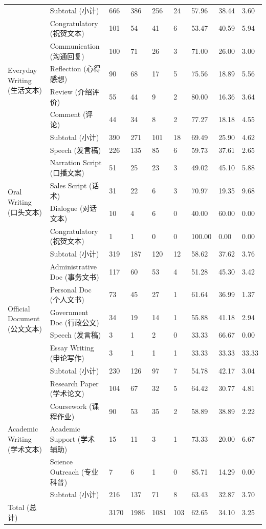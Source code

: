 {\begin{longtable}[]{@{}lllllllll@{}}
& Subtotal (小计) & 666 & 386 & 256 & 24 & 57.96 & 38.44 & 3.60 \\
\multirow{6}{*}{Everyday Writing (生活文本)} & Congratulatory (祝贺文本)
& 101 & 54 & 41 & 6 & 53.47 & 40.59 & 5.94 \\
& Communication (沟通回复) & 100 & 71 & 26 & 3 & 71.00 & 26.00 & 3.00 \\
& Reflection (心得感想) & 90 & 68 & 17 & 5 & 75.56 & 18.89 & 5.56 \\
& Review (介绍评价) & 55 & 44 & 9 & 2 & 80.00 & 16.36 & 3.64 \\
& Comment (评论) & 44 & 34 & 8 & 2 & 77.27 & 18.18 & 4.55 \\
& Subtotal (小计) & 390 & 271 & 101 & 18 & 69.49 & 25.90 & 4.62 \\
\multirow{6}{*}{Oral Writing (口头文本)} & Speech (发言稿) & 226 & 135 &
85 & 6 & 59.73 & 37.61 & 2.65 \\
& Narration Script (口播文案) & 51 & 25 & 23 & 3 & 49.02 & 45.10 &
5.88 \\
& Sales Script (话术) & 31 & 22 & 6 & 3 & 70.97 & 19.35 & 9.68 \\
& Dialogue (对话文本) & 10 & 4 & 6 & 0 & 40.00 & 60.00 & 0.00 \\
& Congratulatory (祝贺文本) & 1 & 1 & 0 & 0 & 100.00 & 0.00 & 0.00 \\
& Subtotal (小计) & 319 & 187 & 120 & 12 & 58.62 & 37.62 & 3.76 \\
\multirow{6}{*}{Official Document (公文文本)} & Administrative Doc
(事务文书) & 117 & 60 & 53 & 4 & 51.28 & 45.30 & 3.42 \\
& Personal Doc (个人文书) & 73 & 45 & 27 & 1 & 61.64 & 36.99 & 1.37 \\
& Government Doc (行政公文) & 34 & 19 & 14 & 1 & 55.88 & 41.18 & 2.94 \\
& Speech (发言稿) & 3 & 1 & 2 & 0 & 33.33 & 66.67 & 0.00 \\
& Essay Writing (申论写作) & 3 & 1 & 1 & 1 & 33.33 & 33.33 & 33.33 \\
& Subtotal (小计) & 230 & 126 & 97 & 7 & 54.78 & 42.17 & 3.04 \\
\multirow{5}{*}{Academic Writing (学术文本)} & Research Paper (学术论文)
& 104 & 67 & 32 & 5 & 64.42 & 30.77 & 4.81 \\
& Coursework (课程作业) & 90 & 53 & 35 & 2 & 58.89 & 38.89 & 2.22 \\
& Academic Support (学术辅助) & 15 & 11 & 3 & 1 & 73.33 & 20.00 &
6.67 \\
& Science Outreach (专业科普) & 7 & 6 & 1 & 0 & 85.71 & 14.29 & 0.00 \\
& Subtotal (小计) & 216 & 137 & 71 & 8 & 63.43 & 32.87 & 3.70 \\
Total (总计) & & 3170 & 1986 & 1081 & 103 & 62.65 & 34.10 & 3.25 \\
\end{longtable}
}

